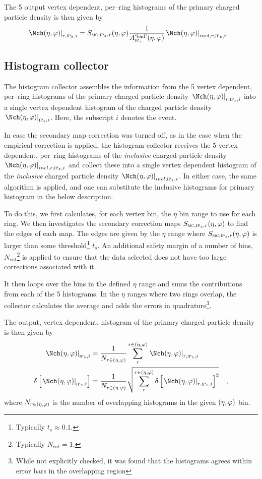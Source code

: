 The 5 output vertex dependent, per--ring histograms of the primary
charged particle density is then given by
\begin{align}
  \dndetadphi[r,\subIPz,i] &=
  \SecMap{} \frac{1}{\DeadCh{}}\dndetadphi[incl,r,\subIPz,i]
\end{align}

\subsection{Histogram collector}
\label{sec:sub:hist_collector}

The histogram collector assembles the information from the 5 vertex
dependent, per--ring histograms of the primary charged particle
density $\dndetadphi[r,\subIPz,i]$ into a single vertex dependent
histogram of the charged particle density $\dndetadphi[\subIPz,i]$.
Here, the subscript $i$ denotes the event. 

In case the secondary map correction was turned off, as in the case
when the empirical correction is applied, the histogram collector
receives the 5 vertex dependent, per--ring histograms of the
\emph{inclusive} charged particle density
$\dndetadphi[incl,r,\subIPz,i]$ and collect these into a single vertex
dependent histogram of the \emph{inclusive} charged particle density
$\dndetadphi[incl,\subIPz,i]$.  In either case, the same algorithm is
applied, and one can substitute the inclusive histograms for primary
histogram in the below description. 

To do this, we first calculates, for each vertex bin, the $\eta$ bin
range to use for each ring.  We then investigates the secondary
correction maps $\SecMap{}$ to find the edges of each map.  The edges
are given by the $\eta$ range where $\SecMap{}$ is larger than some
threshold\footnote{Typically $t_s\approx 0.1$.}  $t_s$. An additional
safety margin of a number of bins, $N_{cut}$\footnote{Typically
  $N_{cut}=1$.} is applied to ensure that the data selected does not
have too large corrections associated with it.

It then loops over the bins in the defined $\eta$ range and sums the
contributions from each of the 5 histograms.  In the $\eta$ ranges
where two rings overlap, the collector calculates the average and adds
the errors in quadrature\footnote{While not explicitly checked, it was
  found that the histograms agrees within error bars in the
  overlapping region}.

The output, vertex dependent, histogram of the primary
charged particle density is then given by
\begin{align}
  \label{eq:superhist}
  \dndetadphi[\subIPz,i] &=
  \frac{1}{N_{r\in\etaphi}}\sum_{r}^{r\in\etaphi}  
  \dndetadphi[r,\subIPz,i]\\
  \delta\left[\dndetadphi[\subIPz,i]\right] &=
  \frac{1}{N_{r\in\etaphi}}\sqrt{\sum_{r}^{r\in\etaphi}   
    \delta\left[\dndetadphi[r,\subIPz,i]\right]^2}
  \quad,
\end{align}
where $N_{r\in(\eta,\varphi)}$ is the number of overlapping histograms
in the given $(\eta,\varphi)$ bin. 


